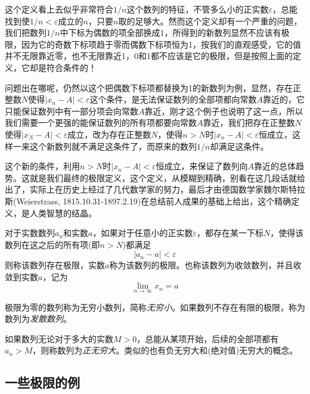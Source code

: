 这个定义看上去似乎非常符合$1/n$这个数列的特征，不管多么小的正实数$\varepsilon$，总能找到使$1/n < \varepsilon$成立的$n$，只要$n$取的足够大。然而这个定义却有一个严重的问题，我们把数列$1/n$中下标为偶数的项全部换成1，所得到的新数列显然不应该有极限，因为它的奇数下标项趋于零而偶数下标项恒为1，按我们的直观感受，它的值并不无限靠近零，也不无限靠近1，0和1都不应该是它的极限，但是按照上面的定义，它却是符合条件的！

问题出在哪呢，仍然以这个把偶数下标项都替换为1的新数列为例，显然，存在正整数$N$使得$|x_n-A|<\varepsilon$这个条件，是无法保证数列的全部项都向常数$A$靠近的，它只能保证数列中有一部分项会向常数$A$靠近，刚才这个例子也说明了这一点，所以我们需要一个更强的能保证数列的所有项都要向常数$A$靠近，我们把存在正整数$N$使得$|x_N-A|<\varepsilon$成立，改为存在正整数$N$，使得$n>N$时$|x_n-A|<\varepsilon$恒成立，这样一来这个新数列就不满足这条件了，而原来的数列$1/n$却满足这条件。

这个新的条件，利用$n>N$时$|x_n-A|<\varepsilon$恒成立，来保证了数列向$A$靠近的总体趋势。这就是我们最终的极限定义，这个定义，从模糊到精确，别看在这几段话就给出了，实际上在历史上经过了几代数学家的努力，最后才由德国数学家魏尔斯特拉斯(Weierstrass, 1815.10.31-1897.2.19)在总结前人成果的基础上给出，这个精确定义，是人类智慧的结晶。

\begin{definition}
  对于实数数列${a_n}$和实数$a$，如果对于任意小的正实数$\varepsilon$，都存在某一下标$N$，使得该数列在这之后的所有项(即$n>N$)都满足
  \begin{equation}
    \label{eq:the-definition-of-sequence-limit}
    |a_n-a|<\varepsilon
  \end{equation}
  则称该数列存在极限，实数$a$称为该数列的极限。也称该数列为收敛数列，并且收敛到实数$a$，记为
  \begin{equation}
    \label{eq:limit-definition-for-number-sequence}
    \lim_{n \to \infty}x_n = a
  \end{equation}
\end{definition}

极限为零的数列称为无穷小数列，简称\emph{无穷小}。如果数列不存在有限的极限，称为数列为\emph{发散数列}。

如果数列无论对于多大的实数$M>0$，总能从某项开始，后续的全部项都有$a_n>M$，则称数列为\emph{正无穷大}。类似的也有负无穷大和(绝对值)无穷大的概念。

\subsection{一些极限的例}
\label{sec:some-examples-about-limit-of-number-sequence}

